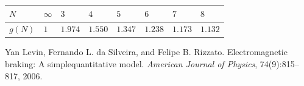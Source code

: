 \documentclass[12pt]{article}
\begin{document}
\begin{center}
\begin{tabular}{| >{\centering\arraybackslash}m{1cm}| >{\centering\arraybackslash}m{1cm}| >{\centering\arraybackslash}m{1cm}| >{\centering\arraybackslash}m{1cm}| >{\centering\arraybackslash}m{1cm}| >{\centering\arraybackslash}m{1cm}| >{\centering\arraybackslash}m{1cm}| >{\centering\arraybackslash}m{1cm}|}
\hline 
$N$ & $\infty$  & $3$ & $4$ & $5$ & $6$ & $7$ & $8$ \\
\hline
$g(N)$ & $1$ & $1.974$ & $1.550$ & $1.347$ & $1.238$ & $1.173$ & $1.132$ \\
\hline
\end{tabular}
\end{center}


\begin{thebibliography}{1}
	 Yan Levin, Fernando L. da Silveira, and Felipe B. Rizzato. Electromagnetic braking: A simplequantitative model. \textit{American Journal of Physics}, 74(9):815–817, 2006.
\end{thebibliography}	
\end{document}
